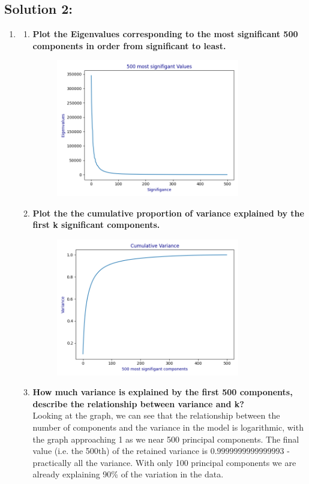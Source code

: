 \documentclass[submit]{harvardml}
\begin{document}
\newpage
\subsection*{Solution 2:}
\begin{enumerate}
    \item
    \begin{enumerate}
        \item 
        \textbf{Plot the Eigenvalues corresponding to the most significant 500 components in order from significant to least.}
        \begin{figure}[H]
            \includegraphics[width=8cm]{hw5/plots/2_1a.png}
            \centering
        \end{figure}
        
        \item \textbf{Plot the the cumulative proportion of variance explained by the first k significant components.}
        \begin{figure}[H]
            \includegraphics[width=8cm]{hw5/plots/2_1b.png}
            \centering
        \end{figure}
        \item \textbf{How much variance is explained by the first 500 components, describe the relationship between variance and k?}\\
        Looking at the graph, we can see that the relationship between the number of components and the variance in the model is logarithmic, with the graph approaching 1 as we near 500 principal components. The final value (i.e. the 500th) of the retained variance is $0.9999999999999993$ - practically all the variance. With only 100 principal components we are already explaining 90\% of the variation in the data. 
    \end{enumerate}
    

\end{enumerate}
\end{document}
